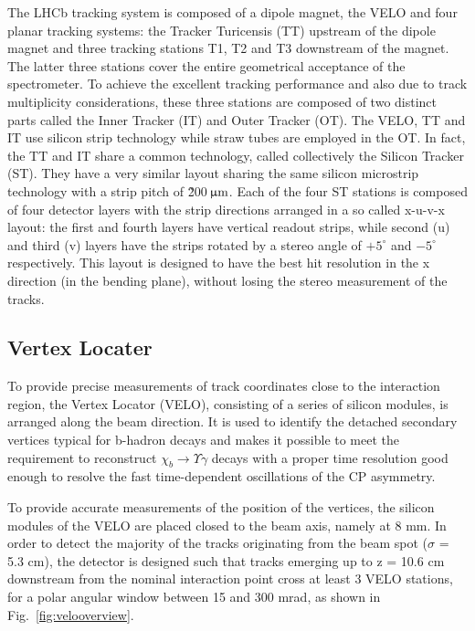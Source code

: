 The LHCb tracking system is composed of a dipole magnet, the VELO and four 
planar tracking systems: the Tracker Turicensis (TT) upstream of the dipole 
magnet and three tracking stations T1, T2 and T3 downstream of the magnet. 
The latter three stations cover the entire geometrical acceptance of the 
spectrometer. To achieve the excellent tracking performance and also due to 
track multiplicity considerations, these three stations are composed of two 
distinct parts called the Inner Tracker (IT) and Outer Tracker (OT). 
The VELO, TT and IT use silicon strip technology while straw tubes are 
employed in the OT. In fact, the TT and IT share a common technology, 
called collectively the Silicon Tracker (ST). They have a very similar layout
sharing the same silicon microstrip technology with a strip pitch
of \~ 200$\,\upmu\rm m$. Each of the four ST stations is composed of four detector 
layers with the strip directions arranged in a so called x-u-v-x layout: 
the first and fourth layers have vertical readout strips, while second (u) 
and third (v) layers have the strips rotated by a stereo angle of $+5^\circ$ 
and $-5^\circ$ respectively. This layout is designed to have the best hit
resolution in the x direction (in the bending plane), without losing the 
stereo measurement of the tracks.

\subsection{Vertex Locater}

To provide precise measurements of track coordinates close to the interaction 
region, the Vertex Locator (VELO), consisting of a series of silicon modules, 
is arranged along the beam direction. It is used to identify the detached 
secondary vertices typical for b-hadron decays and makes it possible to meet 
the requirement to reconstruct  $\chi_b \rightarrow \Upsilon \gamma$ decays
with a proper time resolution good  enough to resolve the fast time-dependent
oscillations of the CP asymmetry.

To provide accurate measurements of the position of the vertices, the silicon
modules of the VELO are placed closed to the beam axis, namely at 8 mm.
In order to detect the majority of the tracks originating
from the beam spot ($\sigma$ = 5.3 cm), the detector is designed such that
tracks emerging up to z = 10.6 cm downstream from the nominal interaction
point cross at least 3 VELO stations, for a polar angular window between 15
and 300 mrad, as shown in Fig.~\ref{fig:velooverview}.

